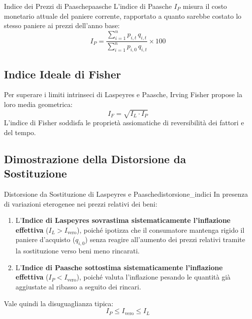 \begin{definizione}{Indice dei Prezzi di Paasche}{paasche}
L'indice di Paasche $I_P$ misura il costo monetario attuale del paniere corrente, rapportato a quanto sarebbe costato lo stesso paniere ai prezzi dell'anno base:
\begin{equation}
    I_P = \frac{\sum_{i=1}^n p_{i,t} \, q_{i,t}}{\sum_{i=1}^n p_{i,0} \, q_{i,t}} \times 100
    \label{eq:paasche}
\end{equation}
\end{definizione}

\subsection{Indice Ideale di Fisher}
Per superare i limiti intrinseci di Laspeyres e Paasche, Irving Fisher propose la loro media geometrica:
\begin{equation}
    I_F = \sqrt{I_L \cdot I_P}
\end{equation}
L'indice di Fisher soddisfa le proprietà assiomatiche di reversibilità dei fattori e del tempo.

\subsection{Dimostrazione della Distorsione da Sostituzione}

\begin{teorema}{Distorsione da Sostituzione di Laspeyres e Paasche}{distorsione_indici}
In presenza di variazioni eterogenee nei prezzi relativi dei beni:
\begin{enumerate}
    \item L'\textbf{Indice di Laspeyres sovrastima sistematicamente l'inflazione effettiva} ($I_L > I_{\text{vero}}$), poiché ipotizza che il consumatore mantenga rigido il paniere d'acquisto ($q_{i,0}$) senza reagire all'aumento dei prezzi relativi tramite la sostituzione verso beni meno rincarati.
    \item L'\textbf{Indice di Paasche sottostima sistematicamente l'inflazione effettiva} ($I_P < I_{\text{vero}}$), poiché valuta l'inflazione pesando le quantità già aggiustate al ribasso a seguito dei rincari.
\end{enumerate}
Vale quindi la disuguaglianza tipica:
\begin{equation}
    I_P \le I_{\text{vero}} \le I_L
\end{equation}
\end{teorema}

